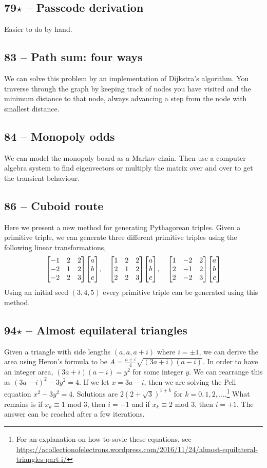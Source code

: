 \documentclass{article}
\begin{document}
\subsection*{79$\star$ -- Passcode derivation} 
Easier to do by hand. 

\subsection*{83 -- Path sum: four ways} 
We can solve this problem by an implementation of Dijkstra's algorithm. 
You traverse through the graph by keeping track of nodes you have visited and the minimum distance to that node, always advancing a step from the node with smallest distance.

\subsection*{84 -- Monopoly odds} 
We can model the monopoly board as a Markov chain. 
Then use a computer-algebra system to find eigenvectors or multiply the matrix over and over to get the transient behaviour.

\subsection*{86 -- Cuboid route} 
Here we present a new method for generating Pythagorean triples.
Given a primitive triple, we can generate three different primitive triples using the following linear transformations,
\[
\mqty[ -1 & 2 & 2 \\ -2 & 1 & 2 \\ -2 & 2 & 3 ] \mqty[ a \\ b \\ c ], \quad
\mqty[ 1 & 2 & 2 \\ 2 & 1 & 2 \\ 2 & 2 & 3 ] \mqty[ a \\ b \\ c ], \quad
\mqty[ 1 & -2 & 2 \\ 2 & -1 & 2 \\ 2 & -2 & 3 ] \mqty[ a \\ b \\ c ]
\]
Using an initial seed $(3, 4, 5)$ every primitive triple can be generated using this method.

\subsection*{94$\star$ -- Almost equilateral triangles} 
Given a triangle with side lengths $(a, a, a+i)$ where $i = \pm 1$, we can derive the area using Heron's formula to be $A = \frac{a+i}{4}\sqrt{(3a+i)(a-i)}$. 
In order to have an integer area, $(3a+i)(a-i) = y^2$ for some integer $y$.
We can rearrange this as $(3a-i)^2 - 3y^2 = 4$. 
If we let $x = 3a-i$, then we are solving the Pell equation $x^2 - 3y^2 = 4$. 
Solutions are $2(2+\sqrt{3})^{1+k}$ for $k = 0, 1, 2, \dotsc$.\footnote{For an explanation on how to sovle these equations, see \url{https://acollectionofelectrons.wordpress.com/2016/11/24/almost-equilateral-triangles-part-i/}}
What remains is if $x_k \equiv 1$ mod 3, then $i = -1$ and if $x_k \equiv 2$ mod 3, then $i = +1$. 
The answer can be reached after a few iterations.
\end{document}
